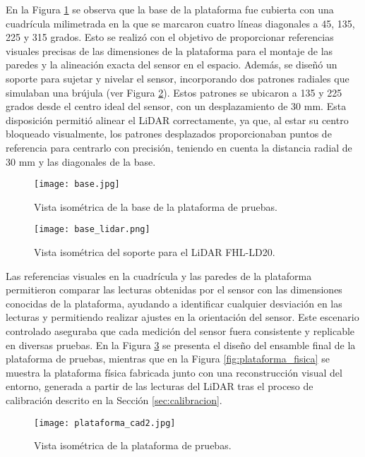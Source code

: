 En la Figura \ref{fig:base} se observa que la base de la plataforma fue cubierta con una cuadrícula milimetrada en la que se marcaron cuatro líneas diagonales a 45, 135, 225 y 315 grados. Esto se realizó con el objetivo de proporcionar referencias visuales precisas de las dimensiones de la plataforma para el montaje de las paredes y la alineación exacta del sensor en el espacio. Además, se diseñó un soporte para sujetar y nivelar el sensor, incorporando dos patrones radiales que simulaban una brújula (ver Figura \ref{fig:soporte}). Estos patrones se ubicaron a 135 y 225 grados desde el centro ideal del sensor, con un desplazamiento de 30 mm. Esta disposición permitió alinear el LiDAR correctamente, ya que, al estar su centro bloqueado visualmente, los patrones desplazados proporcionaban puntos de referencia para centrarlo con precisión, teniendo en cuenta la distancia radial de 30 mm y las diagonales de la base. 

\begin{figure}[H]
	\centering
	\texttt{[image: base.jpg]}
	\caption{Vista isométrica de la base de la plataforma de pruebas.}
	\label{fig:base}
\end{figure}

\begin{figure}[H]
	\centering
	\texttt{[image: base\_lidar.png]}
	\caption{Vista isométrica del soporte para el LiDAR FHL-LD20.}
	\label{fig:soporte}
\end{figure}

Las referencias visuales en la cuadrícula y las paredes de la plataforma permitieron comparar las lecturas obtenidas por el sensor con las dimensiones conocidas de la plataforma, ayudando a identificar cualquier desviación en las lecturas y permitiendo realizar ajustes en la orientación del sensor. Este escenario controlado aseguraba que cada medición del sensor fuera consistente y replicable en diversas pruebas. En la Figura \ref{fig:plataforma_pruebas} se presenta el diseño del ensamble final de la plataforma de pruebas, mientras que en la Figura \ref{fig:plataforma_fisica} se muestra la plataforma física fabricada junto con una reconstrucción visual del entorno, generada a partir de las lecturas del LiDAR tras el proceso de calibración descrito en la Sección \ref{sec:calibracion}.

\begin{figure}[H]
	\centering
	\texttt{[image: plataforma\_cad2.jpg]}
	\caption{Vista isométrica de la plataforma de pruebas.}
	\label{fig:plataforma_pruebas}
\end{figure}

